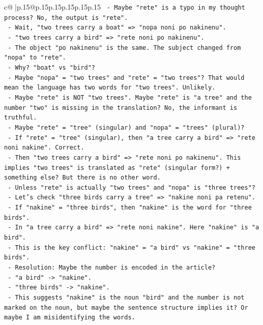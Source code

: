 \documentclass{article}
\begin{document}
{\begin{supertabular}{c@{$\;$}|p{.15\linewidth}@{}p{.15\linewidth}p{.15\linewidth}p{.15\linewidth}p{.15\linewidth}p{.15\linewidth}}
{{{\texttt{   {-} Maybe "rete" is a typo in my thought process? No, the output is "rete".} \\
\texttt{   {-} Wait, "two trees carry a boat" => "nopa noni po nakinenu".} \\
\texttt{   {-} "two trees carry a bird" => "rete noni po nakinenu".} \\
\texttt{   {-} The object "po nakinenu" is the same. The subject changed from "nopa" to "rete".} \\
\texttt{   {-} Why? "boat" vs "bird"?} \\
\texttt{   {-} Maybe "nopa" = "two trees" and "rete" = "two trees"? That would mean the language has two words for "two trees". Unlikely.} \\
\texttt{   {-} Maybe "rete" is NOT "two trees". Maybe "rete" is "a tree" and the number "two" is missing in the translation? No, the informant is truthful.} \\
\texttt{   {-} Maybe "rete" = "tree" (singular) and "nopa" = "trees" (plural)?} \\
\texttt{   {-} If "rete" = "tree" (singular), then "a tree carry a bird" => "rete noni nakine". Correct.} \\
\texttt{   {-} Then "two trees carry a bird" => "rete noni po nakinenu". This implies "two trees" is translated as "rete" (singular form?) + something else? But there is no other word.} \\
\texttt{   {-} Unless "rete" is actually "two trees" and "nopa" is "three trees"?} \\
\texttt{   {-} Let's check "three birds carry a tree" => "nakine noni pa retenu".} \\
\texttt{   {-} If "nakine" = "three birds", then "nakine" is the word for "three birds".} \\
\texttt{   {-} In "a tree carry a bird" => "rete noni nakine". Here "nakine" is "a bird".} \\
\texttt{   {-} This is the key conflict: "nakine" = "a bird" vs "nakine" = "three birds".} \\
\texttt{   {-} Resolution: Maybe the number is encoded in the article?} \\
\texttt{   {-} "a bird" {-}> "nakine".} \\
\texttt{   {-} "three birds" {-}> "nakine".} \\
\texttt{   {-} This suggests "nakine" is the noun "bird" and the number is not marked on the noun, but maybe the sentence structure implies it? Or maybe I am misidentifying the words.} \\
}}}
\end{supertabular}}
\end{document}
